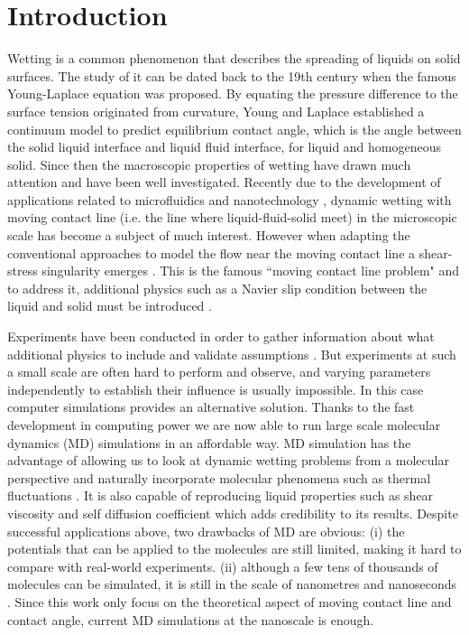 \documentclass[
reprint,
 amsmath,amssymb,
 aps,
url
]{revtex4-1}
\begin{document}
\section{Introduction}

Wetting is a common phenomenon that describes the spreading of liquids on solid surfaces. The study of it can be dated back to the 19th century when the famous Young-Laplace equation \cite{young_iii_1805} was proposed. By equating the pressure difference to the surface tension originated from curvature, Young and Laplace established a continuum model to predict equilibrium contact angle, which is the angle between the solid liquid interface and liquid fluid interface, for liquid and homogeneous solid. Since then the macroscopic properties of wetting have drawn much attention and have been well investigated.  Recently due to the development of applications related to microfluidics and nanotechnology \cite{li_wetting_1994}, dynamic wetting with moving contact line (i.e. the line where liquid-fluid-solid meet) in the microscopic scale has become a subject of much interest. However when adapting the conventional approaches to model the flow near the moving contact line a shear-stress singularity emerges \cite{shikhmurzaev_moving_1997}. This is the famous ``moving contact line problem" and to address it, additional physics such as a Navier slip condition between the liquid and solid must be introduced \cite{td_blake_ydshikhmurzaev_dynamic_2002}.

Experiments have been conducted in order to gather information about what additional physics to include and validate assumptions \cite{chen_convex_2014}. But experiments at such a small scale are often hard to perform and observe, and varying parameters independently to establish their influence is usually impossible. In this case computer simulations provides an alternative solution. Thanks to the fast development in computing power we are now able to run large scale molecular dynamics (MD) simulations in an affordable way. MD simulation has the advantage of allowing us to look at dynamic wetting problems from a molecular perspective and naturally incorporate molecular phenomena such as thermal fluctuations \cite{bertrand_dynamics_2007,bertrand_influence_2009,shang_fluctuating_2011,smith_langevin_2016,fernandez-toledano_molecular-dynamics_2019,fernandez-toledano_contact-line_2019}. It is also capable of reproducing liquid properties such as shear viscosity \cite{hess_determining_2001} and self diffusion coefficient \cite{easteal_self-diffusion_1983} which adds credibility to its results. Despite successful applications above, two drawbacks of MD are obvious: (i) the potentials that can be applied to the molecules are still limited, making it hard to compare with real-world experiments. (ii)  although a few tens of thousands of molecules can be simulated, it is still in the scale of nanometres and nanoseconds \cite{terence_d_blake_physics_2006}. Since this work only focus on the theoretical aspect of moving contact line and contact angle, current MD simulations at the nanoscale is enough.  
\end{document}
